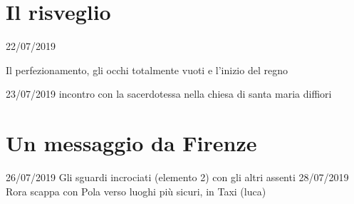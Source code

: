 \section{Il risveglio}
22/07/2019

Il perfezionamento, gli occhi totalmente vuoti e l'inizio del regno

23/07/2019
incontro con la sacerdotessa nella chiesa di santa maria diffiori
\section{Un messaggio da Firenze}
26/07/2019
Gli sguardi incrociati (elemento 2) con gli altri assenti
28/07/2019
Rora scappa con Pola verso luoghi più sicuri, in Taxi (luca)
